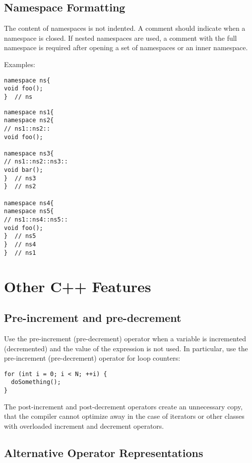 \documentclass[a4paper]{article}
\begin{document}
\subsection{Namespace Formatting}

The content of namespaces is not indented.
A comment should indicate when a namespace is closed.
If nested namespaces are used, a comment with the full namespace is required after opening a set of namespaces or an inner namespace.

Examples:
\begin{lstlisting}
namespace ns{
void foo();
}  // ns
\end{lstlisting}

\begin{lstlisting}
namespace ns1{
namespace ns2{
// ns1::ns2::
void foo();

namespace ns3{
// ns1::ns2::ns3::
void bar();
}  // ns3
}  // ns2

namespace ns4{
namespace ns5{
// ns1::ns4::ns5::
void foo();
}  // ns5
}  // ns4
}  // ns1
\end{lstlisting}


\section{Other C++ Features}

\subsection{Pre-increment and pre-decrement}

Use the pre-increment (pre-decrement) operator when a variable is incremented (decremented) and the value of the expression is not used.
In particular, use the pre-increment (pre-decrement) operator for loop counters:

\begin{lstlisting}[showspaces=false]
for (int i = 0; i < N; ++i) {
  doSomething();
}
\end{lstlisting}

The post-increment and post-decrement operators create an unnecessary copy, that the compiler cannot optimize away in the case of iterators or other classes with overloaded increment and decrement operators.

\subsection{Alternative Operator Representations}
\end{document}
